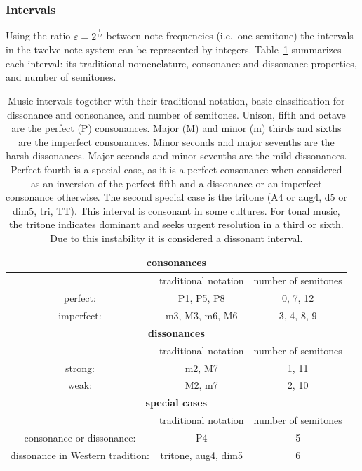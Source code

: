 \subsubsection{Intervals}\label{subsec:intervalos}
Using the ratio $\varepsilon=2^{\frac{1}{12}}$ between note frequencies (i.e.\ one semitone) the intervals in the twelve note system can be represented by integers. Table~\ref{eq:intervalos} summarizes each interval: its traditional nomenclature, consonance and
dissonance properties, and number of semitones.

\begin{table}[htp!]
\centering
\caption{Music intervals together with their traditional notation, basic classification for dissonance and consonance, and number of semitones. Unison, fifth and octave are the perfect (P) consonances. Major (M) and minor (m) thirds and sixths are the imperfect consonances. Minor seconds and major sevenths are the harsh dissonances. Major seconds and minor sevenths are the mild dissonances. Perfect fourth is a special case, as it is a perfect consonance when considered as an inversion of the perfect fifth and a dissonance or an imperfect consonance otherwise. The second special case is the tritone (A4 or aug4, d5 or dim5, tri, TT). This interval is consonant in some cultures.
For tonal music, the tritone indicates dominant and seeks urgent resolution in a third or sixth. Due to this instability it is considered a dissonant interval.}
\begin{tabular}{ c | c | c }\hline
    \multicolumn{3}{c}{\bf consonances}  \\\hline
   & traditional notation & number of semitones \\
   perfect: & P1, P5, P8 & 0, 7, 12 \\
 imperfect: & m3, M3, m6, M6 & 3, 4, 8, 9 \\\hline\hline
    \multicolumn{3}{c}{\bf dissonances} \\\hline
 & traditional notation & number of semitones \\
 strong: & m2, M7 & 1, 11 \\
 weak: & M2, m7 & 2, 10 \\\hline\hline
    \multicolumn{3}{c}{\bf special cases} \\\hline
 & traditional notation & number of semitones \\
 consonance or dissonance: & P4 & 5 \\
 dissonance in Western tradition: & tritone, aug4, dim5 & 6 \\\hline
\end{tabular}\label{eq:intervalos}
\end{table}

